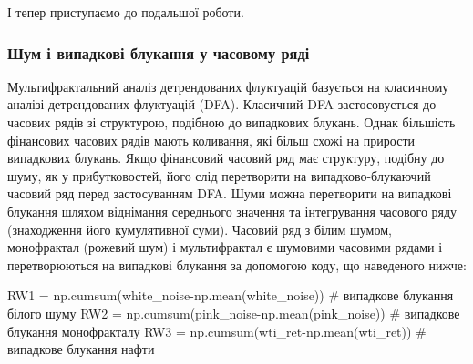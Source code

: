 \documentclass[
  letterpaper,
]{report}
\newenvironment{Shaded}{\begin{snugshade}}{\end{snugshade}}
\newcommand{\CommentTok}[1]{\textcolor[rgb]{0.37,0.37,0.37}{#1}}
\newcommand{\NormalTok}[1]{\textcolor[rgb]{0.00,0.23,0.31}{#1}}
\newcommand{\OperatorTok}[1]{\textcolor[rgb]{0.37,0.37,0.37}{#1}}
\begin{document}
І тепер приступаємо до подальшої роботи.

\hypertarget{ux448ux443ux43c-ux456-ux432ux438ux43fux430ux434ux43aux43eux432ux456-ux431ux43bux443ux43aux430ux43dux43dux44f-ux443-ux447ux430ux441ux43eux432ux43eux43cux443-ux440ux44fux434ux456}{%
\subsubsection{Шум і випадкові блукання у часовому
ряді}\label{ux448ux443ux43c-ux456-ux432ux438ux43fux430ux434ux43aux43eux432ux456-ux431ux43bux443ux43aux430ux43dux43dux44f-ux443-ux447ux430ux441ux43eux432ux43eux43cux443-ux440ux44fux434ux456}}

Мультифрактальний аналіз детрендованих флуктуацій базується на
класичному аналізі детрендованих флуктуацій (DFA). Класичний DFA
застосовується до часових рядів зі структурою, подібною до випадкових
блукань. Однак більшість фінансових часових рядів мають коливання, які
більш схожі на прирости випадкових блукань. Якщо фінансовий часовий ряд
має структуру, подібну до шуму, як у прибутковостей, його слід
перетворити на випадково-блукаючий часовий ряд перед застосуванням DFA.
Шуми можна перетворити на випадкові блукання шляхом віднімання
середнього значення та інтегрування часового ряду (знаходження його
кумулятивної суми). Часовий ряд з білим шумом, монофрактал (рожевий шум)
і мультифрактал є шумовими часовими рядами і перетворюються на випадкові
блукання за допомогою коду, що наведеного нижче:

\begin{Shaded}
\begin{Highlighting}[]
\NormalTok{RW1 }\OperatorTok{=}\NormalTok{ np.cumsum(white\_noise}\OperatorTok{{-}}\NormalTok{np.mean(white\_noise)) }\CommentTok{\# випадкове блукання білого шуму}
\NormalTok{RW2 }\OperatorTok{=}\NormalTok{ np.cumsum(pink\_noise}\OperatorTok{{-}}\NormalTok{np.mean(pink\_noise))   }\CommentTok{\# випадкове блукання монофракталу}
\NormalTok{RW3 }\OperatorTok{=}\NormalTok{ np.cumsum(wti\_ret}\OperatorTok{{-}}\NormalTok{np.mean(wti\_ret))         }\CommentTok{\# випадкове блукання нафти}
\end{Highlighting}
\end{Shaded}
\end{document}

